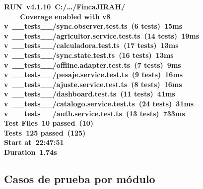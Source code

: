 \documentclass[12pt, a4paper]{article}
\begin{document}
\begin{tcolorbox}[
  enhanced, breakable,
  colback=CNavy, coltext=white, colframe=CNavy,
  arc=4pt, left=10pt, right=10pt, top=8pt, bottom=8pt,
  fontupper=\ttfamily\small
]
\color{CAccentLight}\bfseries RUN\normalfont\color{white}\ v4.1.10\ C:/\ldots/FincaJIRAH/\\
\color{white!70}\ \ \ \ Coverage enabled with v8\\[4pt]
\color{CSuccess} \textbf{v}\ \_\_tests\_\_/sync.observer.test.ts\ (6 tests)\ 15ms\\
\color{CSuccess} \textbf{v}\ \_\_tests\_\_/agricultor.service.test.ts\ (14 tests)\ 19ms\\
\color{CSuccess} \textbf{v}\ \_\_tests\_\_/calculadora.test.ts\ (17 tests)\ 13ms\\
\color{CSuccess} \textbf{v}\ \_\_tests\_\_/sync.state.test.ts\ (16 tests)\ 13ms\\
\color{CSuccess} \textbf{v}\ \_\_tests\_\_/offline.adapter.test.ts\ (7 tests)\ 9ms\\
\color{CSuccess} \textbf{v}\ \_\_tests\_\_/pesaje.service.test.ts\ (9 tests)\ 16ms\\
\color{CSuccess} \textbf{v}\ \_\_tests\_\_/ajuste.service.test.ts\ (8 tests)\ 16ms\\
\color{CSuccess} \textbf{v}\ \_\_tests\_\_/dashboard.test.ts\ (11 tests)\ 41ms\\
\color{CSuccess} \textbf{v}\ \_\_tests\_\_/catalogo.service.test.ts\ (24 tests)\ 31ms\\
\color{CSuccess} \textbf{v}\ \_\_tests\_\_/auth.service.test.ts\ (13 tests)\ 733ms\\[4pt]
\color{white!60} Test Files\ \color{CSuccess}\textbf{10 passed}\ \color{white!60}(10)\\
\color{white!60} Tests\ \color{CSuccess}\textbf{125 passed}\ \color{white!60}(125)\\
\color{white!60} Start at\ 22:47:51\\
\color{white!60} Duration\ \textbf{1.74s}
\end{tcolorbox}

\subsection{Casos de prueba por módulo}
\end{document}
